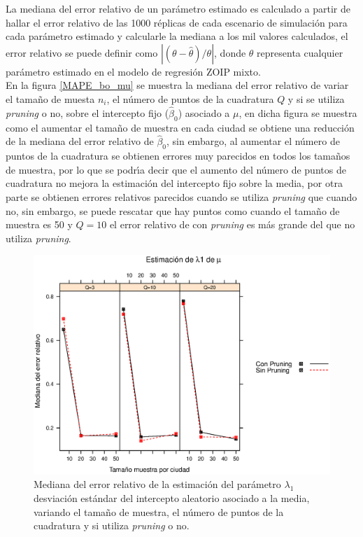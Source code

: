 La mediana del error relativo de un par\'{a}metro estimado es calculado a partir de hallar el error relativo de las 1000 r\'{e}plicas de cada escenario de simulaci\'{o}n para cada par\'{a}metro estimado y calcularle la mediana a los mil valores calculados, el error relativo se puede definir como $|(\theta-\hat{\theta})/\theta|$, donde $\theta$ representa cualquier par\'{a}metro estimado en el modelo de regresi\'{o}n ZOIP mixto. \\

En la figura \ref{MAPE_bo_mu} se muestra la mediana del error relativo de variar el tama\~{n}o de muesta $n_i$, el n\'{u}mero de puntos de la cuadratura $Q$ y si se utiliza \textit{pruning} o no, sobre el intercepto fijo ($\hat{\beta}_0$) asociado a $\mu$, en dicha figura se muestra como el aumentar el tama\~{n}o de muestra en cada ciudad se obtiene una reducci\'{o}n de la mediana del error relativo de $\hat{\beta}_0$, sin embargo, al aumentar el n\'{u}mero de puntos de la cuadratura se obtienen errores muy parecidos en todos los tama\~{n}os de muestra, por lo que se podr\'{\i}a decir que el aumento del n\'{u}mero de puntos de cuadratura no mejora la estimaci\'{o}n del intercepto fijo sobre la media, por otra parte se obtienen errores relativos parecidos cuando se utiliza \textit{pruning} que cuando no, sin embargo, se puede rescatar que hay puntos como cuando el tama\~{n}o de muestra es 50 y $Q=10$ el error relativo de con \textit{pruning} es m\'{a}s grande del que no utiliza \textit{pruning}.\\

\begin{figure}
	\begin{center}
		\includegraphics[scale=0.6]{MAPE_lambda1_mu.eps}	
		\caption{Mediana del error relativo de la estimaci\'{o}n del par\'{a}metro $\lambda_1$ desviaci\'{o}n est\'{a}ndar del intercepto aleatorio asociado a la media, variando el tama\~{n}o de muestra, el n\'{u}mero de puntos de la cuadratura y si utiliza \textit{pruning} o no.}
		\label{MAPE_lambda1_mu}
	\end{center}
\end{figure}

